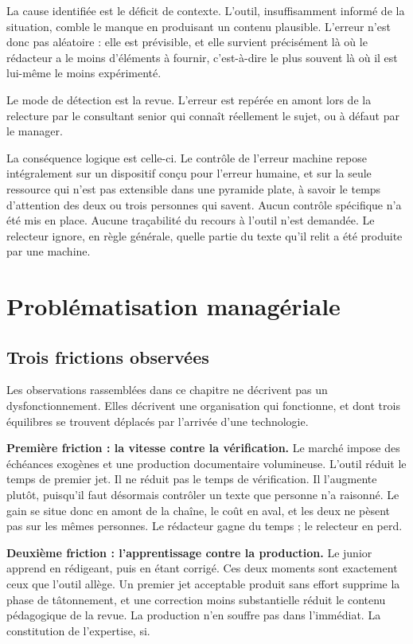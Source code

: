 La cause identifiée est le déficit de contexte. L'outil, insuffisamment informé de la
situation, comble le manque en produisant un contenu plausible. L'erreur n'est donc pas
aléatoire : elle est prévisible, et elle survient précisément là où le rédacteur a le moins
d'éléments à fournir, c'est-à-dire le plus souvent là où il est lui-même le moins
expérimenté.

Le mode de détection est la revue. L'erreur est repérée en amont lors de la relecture par
le consultant senior qui connaît réellement le sujet, ou à défaut par le manager.

La conséquence logique est celle-ci. Le contrôle de l'erreur machine repose intégralement
sur un dispositif conçu pour l'erreur humaine, et sur la seule ressource qui n'est pas
extensible dans une pyramide plate, à savoir le temps d'attention des deux ou trois
personnes qui savent. Aucun contrôle spécifique n'a été mis en place. Aucune traçabilité du
recours à l'outil n'est demandée. Le relecteur ignore, en règle générale, quelle partie du
texte qu'il relit a été produite par une machine.

\section{Problématisation managériale}

\subsection{Trois frictions observées}

Les observations rassemblées dans ce chapitre ne décrivent pas un dysfonctionnement. Elles
décrivent une organisation qui fonctionne, et dont trois équilibres se trouvent déplacés
par l'arrivée d'une technologie.

\textbf{Première friction : la vitesse contre la vérification.} Le marché impose des
échéances exogènes et une production documentaire volumineuse. L'outil réduit le temps de
premier jet. Il ne réduit pas le temps de vérification. Il l'augmente plutôt, puisqu'il
faut désormais contrôler un texte que personne n'a raisonné. Le gain se situe donc en amont
de la chaîne, le coût en aval, et les deux ne pèsent pas sur les mêmes personnes. Le
rédacteur gagne du temps ; le relecteur en perd.

\textbf{Deuxième friction : l'apprentissage contre la production.} Le junior apprend en
rédigeant, puis en étant corrigé. Ces deux moments sont exactement ceux que l'outil
allège. Un premier jet acceptable produit sans effort supprime la phase de tâtonnement, et
une correction moins substantielle réduit le contenu pédagogique de la revue. La production
n'en souffre pas dans l'immédiat. La constitution de l'expertise, si.

